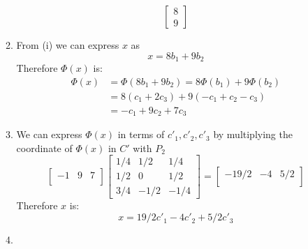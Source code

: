 \documentclass[12pt]{article}
\begin{document}
\begin{enumerate}[label=\alph*.]
\begin{enumerate}[label=(\roman*)]
                        \begin{equation*}
                            \left[\begin{matrix}
                                8\\
                                9
                            \end{matrix}\right]
                        \end{equation*}
                    \item From (i) we can express $x$ as 
                        \begin{equation*}
                            x = 8b_1 + 9b_2
                        \end{equation*}
                        Therefore $\Phi(x)$ is:
                        \begin{align*}
                            \Phi(x) &= \Phi(8b_1 + 9b_2) = 8\Phi(b_1) + 9 \Phi(b_2)\\
                            &= 8(c_1 + 2c_3) + 9(-c_1 + c_2 -c_3)\\
                            &= -c_1 + 9c_2 + 7c_3
                        \end{align*}
                    \item We can express $\Phi(x)$ in terms of $c'_1, c'_2, c'_3$ by multiplying the coordinate of $\Phi(x)$ in $C'$ with $P_2$
                        \begin{equation*}
                            \left[\begin{matrix}
                                -1 & 9 & 7\\
                            \end{matrix}\right]
                            \left[\begin{matrix}
                                1/4 &  1/2 & 1/4\\
                                1/2 &    0 & 1/2\\
                                3/4 & -1/2 & -1/4
                            \end{matrix}\right]
                            = \left[\begin{matrix}
                                -19/2 & -4 & 5/2\\
                            \end{matrix}\right]
                        \end{equation*}
                        Therefore $x$ is:
                        \begin{equation*}
                            x = 19/2 c'_1 - 4 c'_2 + 5/2 c'_3
                        \end{equation*}
                    \item 
                \end{enumerate}
            \end{enumerate}
\end{document}
